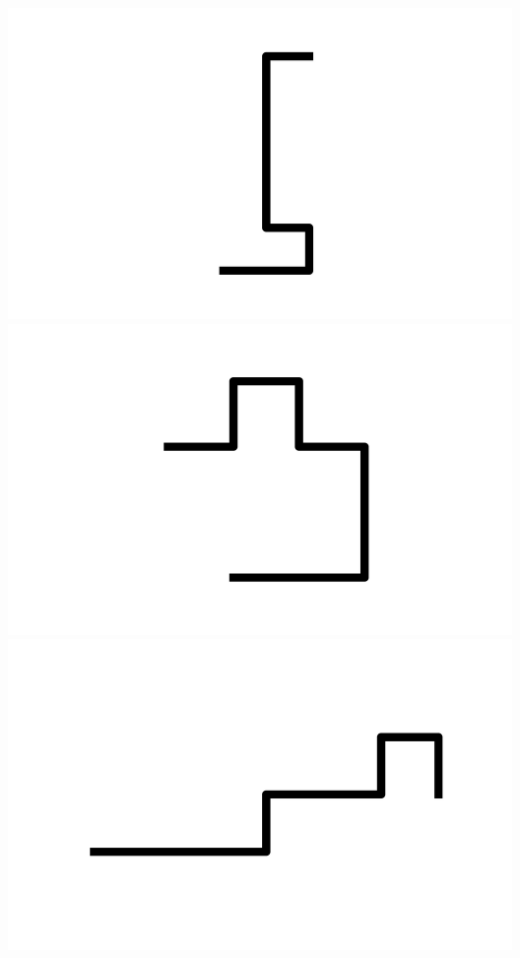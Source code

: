 \documentclass[]{report}
\begin{document}
\includegraphics[scale=.1]{pictures/21/state_cluster_shapes_52.pdf} 
\includegraphics[scale=.1]{pictures/21/state_cluster_shapes_53.pdf} 
\includegraphics[scale=.1]{pictures/21/state_cluster_shapes_54.pdf} 
\end{document}
